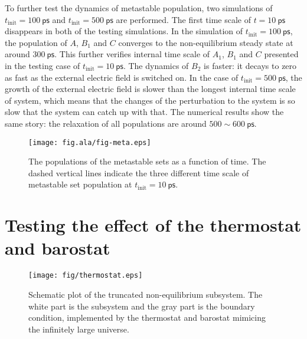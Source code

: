 \documentclass[a4paper,preprint,onecolumn]{revtex4-1}
\begin{document}
To further test the dynamics of metastable population, two simulations
of $t_{\textrm{init}} = 100~\textsf{ps}$ and $t_{\textrm{init}} =
500~\textsf{ps}$ are performed. The first time scale of $t =
10~\textsf{ps}$ disappears in both of the testing simulations. In the
simulation of $t_{\textrm{init}} = 100~\textsf{ps}$, the population of
$A$, $B_1$ and $C$ converges to the non-equilibrium steady state at
around $300~\textsf{ps}$. This further verifies internal time scale of
$A_1$, $B_1$ and $C$ presented in the testing case of
$t_{\textrm{init}} = 10~\textsf{ps}$.  The dynamics of $B_2$ is
faster: it decays to zero as fast as the external electric field is
switched on. In the case of $t_{\textrm{init}} = 500~\textsf{ps}$, the
growth of the external electric field is slower than the longest
internal time scale of system, which means that the changes of the
perturbation to the system is so slow that the system can catch up
with that. The numerical results show the same story: the relaxation
of all populations are around $500 \sim 600~\textsf{ps}$.
\\

\begin{figure}
  \centering
  \texttt{[image: fig.ala/fig-meta.eps]}
  \caption{The populations of the metastable sets as a function of time.
    The dashed vertical lines indicate the three different time scale of
  metastable set population at $t_{\textrm{init}} = 10~\textsf{ps}$.}
  \label{fig:tmp5}
\end{figure}

\section{Testing the effect of the thermostat and barostat}
\begin{figure}
  \centering
  \texttt{[image: fig/thermostat.eps]}
  \caption{Schematic plot of the truncated non-equilibrium subsystem.
    The white part is the subsystem and the gray part is the boundary
    condition, implemented by the thermostat and barostat mimicing
    the infinitely large universe.}
  \label{fig:tmp2}
\end{figure}




\end{document}

